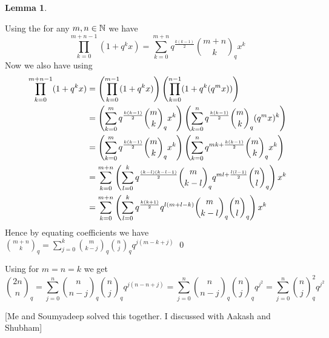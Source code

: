 \documentclass[a4paper, 11pt]{article}
\newtheorem{lemma}{Lemma}
\renewenvironment{proof}{\noindent{\it \textbf{Proof:}}\hspace*{1em}}{\hfill\qed\bigskip\\}
\begin{document}
{\begin{itemize}
\begin{itemize}
\begin{lemma}
\end{lemma}
\begin{proof}
	Using the  for any $m,n\in \mathbb{N}$ we have $$\prod\limits_{k=0}^{m+n-1}(1+q^kx)=\sum\limits_{k=0}^{m+n}q^{\frac{k(k-1)}2}\binom{m+n}{k}_qx^k$$Now we also have using  \begin{align*}
		\prod_{k=0}^{m+n-1}(1+q^kx)& =\left(  \prod_{k=0}^{m-1}(1+q^kx)\right)\left( \prod_{k=0}^{n-1}(1+q^{k}(q^m x)) \right)\\
		& = \left(\sum\limits_{k=0}^{m}q^{\frac{k(k-1)}2}\binom{m}{k}_qx^k\right)\left(\sum\limits_{k=0}^{n}q^{\frac{k(k-1)}2}\binom{m}{k}_q(q^m x)^k\right)\\
		& = \left(\sum\limits_{k=0}^{m}q^{\frac{k(k-1)}2}\binom{m}{k}_qx^k\right)\left(\sum\limits_{k=0}^{n}q^{mk+\frac{k(k-1)}2}\binom{m}{k}_qx^k\right)\\
		& = \sum_{k=0}^{m+n}\left(\sum_{l=0}^k q^{\frac{(k-l)(k-l-1)}2}\binom{m}{k-l}_qq^{ml+\frac{l(l-1)}{2}}\binom{n}{l}_q  \right)x^k\\
		& = \sum_{k=0}^{m+n}\left(\sum_{l=0}^k q^{\frac{k(k+1)}2}q^{l(m+l-k)}\binom{m}{k-l}_q\binom{n}{l}_q \right)x^k
	\end{align*}
Hence by equating coefficients we have $\binom {m+n}{k}_{\!\!q}=\sum\limits _{j=0}^k{\binom {m}{k-j}}_{\!\!q}{\binom {n}{j}}_{\!\!q}q^{j(m-k+j)}$
\end{proof}

Using  for $m=n=k$ we get $$\binom {2n}{n}_{\!\!q}=\sum\limits _{j=0}^n{\binom {n}{n-j}}_{\!\!q}{\binom {n}{j}}_{\!\!q}q^{j(n-n+j)}=\sum\limits _{j=0}^n{\binom {n}{n-j}}_{\!\!q}{\binom {n}{j}}_{\!\!q}q^{j^2}=\sum\limits _{j=0}^n{\binom {n}{j}}_{\!\!q}^2q^{j^2}$$
\end{itemize}
\end{itemize}
}\parinf

[Me and Soumyadeep solved this together. I discussed with Aakash and Shubham]\parinn
\end{document}
